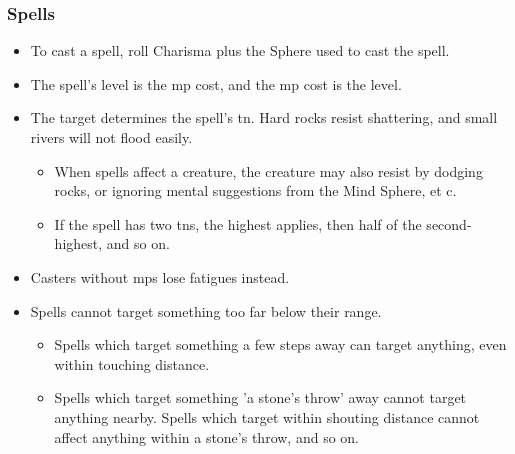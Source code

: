 \subsubsection*{Spells}
\begin{itemize}
  \item
  To cast a spell, roll Charisma plus the Sphere used to cast the spell.
  \item
  The spell's level is the \gls{mp} cost, and the \gls{mp} cost is the level.
  \item
  The target determines the spell's \gls{tn}.
  Hard rocks resist shattering, and small rivers will not flood easily.
  \begin{itemize}
    \item
    When spells affect a creature, the creature may also resist by dodging rocks, or ignoring mental suggestions from the Mind Sphere, et c.
    \item
    If the spell has two \glspl{tn}, the highest applies, then half of the second-highest, and so on.
  \end{itemize}
  \item
  Casters without \glspl{mp} lose \glspl{fatigue} instead.
  \item
  Spells cannot target something too far below their range.
  \begin{itemize}
    \item
    Spells which target something a few steps away can target anything, even within touching distance.
    \item
    Spells which target something 'a stone's throw' away cannot target anything nearby.
    Spells which target within shouting distance cannot affect anything within a stone's throw, and so on.
  \end{itemize}
\end{itemize}
